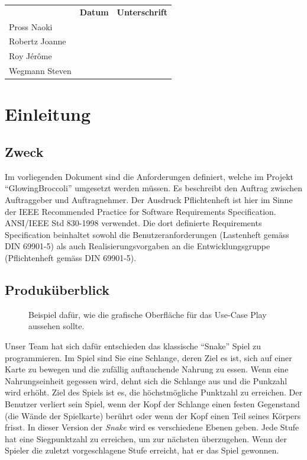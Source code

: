 \documentclass[a4paper, twosided, 11pt]{scrartcl}
\begin{document}
\vfill
{
  \renewcommand{\arraystretch}{2}
  \begin{tabularx}{\textwidth}{lp{}X}
                   & \bfseries Datum & \bfseries Unterschrift \\
    Pross Naoki    & \hrulefill & \hrulefill \\
    Robertz Joanne & \hrulefill & \hrulefill \\
    Roy J\'er\^ome & \hrulefill & \hrulefill \\
    Wegmann Steven & \hrulefill & \hrulefill \\
  \end{tabularx}
}

\clearpage
\tableofcontents
\listoffigures
\listoftables

\clearpage

\section{Einleitung}
\subsection{Zweck}

Im vorliegenden Dokument sind die Anforderungen definiert, welche im Projekt
``GlowingBroccoli'' umgesetzt werden müssen. Es beschreibt den Auftrag zwischen
Auftraggeber und Auftragnehmer. Der Ausdruck Pflichtenheft ist hier im Sinne
der IEEE Recommended Practice for Software Requirements Specification.
ANSI/IEEE Std 830-1998 verwendet. Die dort definierte Requirements
Specification beinhaltet sowohl die Benutzeranforderungen (Lastenheft gemäss
DIN 69901-5) als auch Realisierungsvorgaben an die Entwicklungsgruppe
(Pflichtenheft gemäss DIN 69901-5).

\subsection{Produk\"uberblick}
\begin{figure}[H]
  \centering
  
  \caption[Beispiel f\"ur grafische Oberfl\"ache in Use Case Play]{
    Beispiel dafür, wie die grafische Oberfläche f\"ur das Use-Case Play aussehen sollte.
  }
\end{figure}

Unser Team hat sich dafür entschieden das klassische ``Snake'' Spiel zu
programmieren.  Im Spiel sind Sie eine Schlange, deren Ziel es ist, sich auf
einer Karte zu bewegen und die zufällig auftauchende Nahrung zu essen. Wenn
eine Nahrungseinheit gegessen wird, dehnt sich die Schlange aus und die
Punkzahl wird erhöht.  Ziel des Spiels ist es, die höchstmögliche Punktzahl zu
erreichen.  Der Benutzer verliert sein Spiel, wenn der Kopf der Schlange einen
festen Gegenstand (die Wände der Spielkarte) berührt oder wenn der Kopf einen
Teil seines Körpers frisst.  In dieser Version der \emph{Snake} wird es
verschiedene Ebenen geben. Jede Stufe hat eine Siegpunktzahl zu erreichen, um
zur nächsten überzugehen. Wenn der Spieler die zuletzt vorgeschlagene Stufe
erreicht, hat er das Spiel gewonnen.
\end{document}

